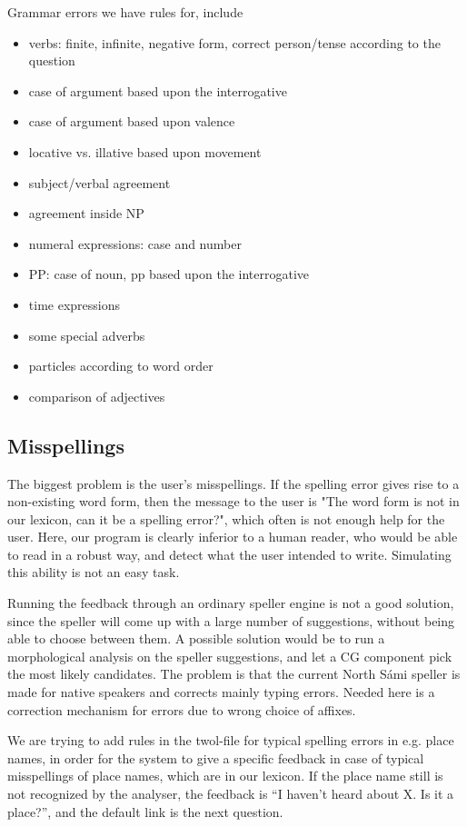 \documentclass[11pt]{article}
\begin{document}
Grammar errors we have rules for, include
\begin{itemize}
\setlength{\itemsep}{-0.2cm}
\item verbs: finite, infinite, negative form, correct person/tense according to the question
\item case of argument based upon the interrogative 
\item case of argument based upon valence
\item locative vs. illative based upon movement
\item subject/verbal agreement
\item agreement inside NP 
\item numeral expressions: case and number 
\item PP: case of noun, pp based upon the interrogative 
\item time expressions 
\item some special adverbs 
\item particles according to word order
\item comparison of adjectives
\end{itemize}

\subsection{Misspellings}
The biggest problem is the user's misspellings. If the spelling error gives rise to a non-existing word form, then the message to the user is "The word form is not in our lexicon, can it be a spelling error?", which often is not enough help for the user. Here, our program is clearly inferior to a human reader, who would be able to read in a robust way, and detect what the user intended to write. Simulating this ability is not an easy task.
 
Running the feedback through an ordinary speller engine is not a good solution, since the speller will come up with a large number of suggestions, without being able to choose between them. A possible solution would be to run a morphological analysis on the speller suggestions, and let a CG component pick the most likely candidates. The problem is that the current North Sámi speller is made for native speakers and corrects mainly typing errors. Needed here is a correction mechanism for errors due to wrong choice of affixes.

We are trying to add rules in the twol-file for typical spelling errors in e.g. place names, in order for the system to give a specific feedback in case of typical misspellings of place names, which are in our lexicon. If the place name still is not recognized by the analyser, the feedback is “I haven’t heard about X. Is it a 
place?”, and the default link is the next question.
\end{document}
